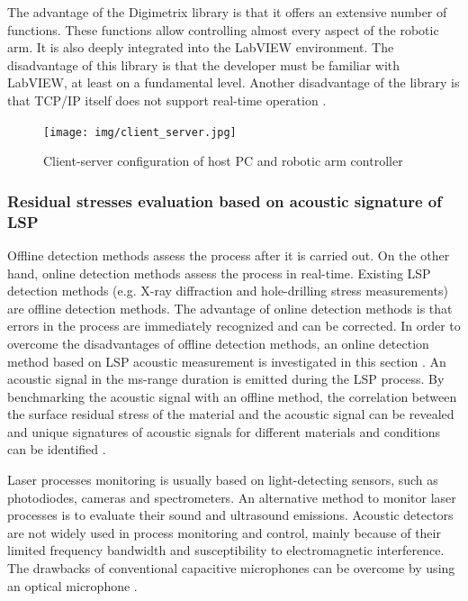 The advantage of the Digimetrix library is that it offers an extensive number of functions. These functions allow controlling almost every aspect of the robotic arm. It is also deeply integrated into the LabVIEW environment. The disadvantage of this library is that the developer must be familiar with LabVIEW, at least on a fundamental level. Another disadvantage of the library is that TCP/IP itself does not support real-time operation \cite{digimetrix}.

\begin{figure}[h]
    \centering
    \texttt{[image: img/client\_server.jpg]}
    \caption{Client-server configuration of host PC and robotic arm controller \cite{digimetrix}}
    \label{fig:client_server}
\end{figure}

\subsubsection*{Residual stresses evaluation based on acoustic signature of LSP}
\label{sec:optical_microphone}



Offline detection methods assess the process after it is carried out. On the other hand, online detection methods assess the process in real-time. Existing LSP detection methods (e.g. X-ray diffraction and hole-drilling stress measurements) are offline detection methods. The advantage of online detection methods is that errors in the process are immediately recognized and can be corrected. In order to overcome the disadvantages of offline detection methods, an online detection method based on LSP acoustic measurement is investigated in this section \cite{wu_zhao_qiao_liu_zhang_hu_2018}. An acoustic signal in the ms-range duration is emitted during the LSP process. By benchmarking the acoustic signal with an offline method, the correlation between the surface residual stress of the material and the acoustic signal can be revealed and unique signatures of acoustic signals for different materials and conditions can be identified \cite{banerjee_2019}. 

Laser processes monitoring is usually based on light-detecting sensors, such as photodiodes, cameras and spectrometers. An alternative method to monitor laser processes is to evaluate their sound and ultrasound emissions. Acoustic detectors are not widely used in process monitoring and control, mainly because of their limited frequency bandwidth and susceptibility to electromagnetic interference. The drawbacks of conventional capacitive microphones can be overcome by using an optical microphone \cite{fischer_rohringer_panzer_hecker_2017}. 

